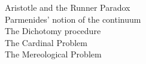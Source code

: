 \documentclass[preview]{standalone}
\begin{document}
Aristotle and the Runner Paradox\\Parmenides' notion of the continuum\\The Dichotomy procedure\\The Cardinal Problem\\The Mereological Problem\\
\end{document}
